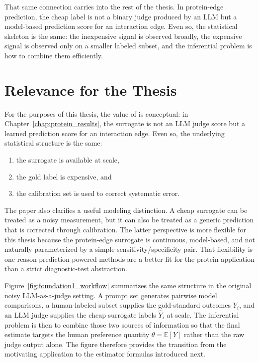 That same connection carries into the rest of the thesis. In protein-edge prediction, the cheap label is not a binary judge produced by an LLM but a model-based prediction score for an interaction edge. Even so, the statistical skeleton is the same: the inexpensive signal is observed broadly, the expensive signal is observed only on a smaller labeled subset, and the inferential problem is how to combine them efficiently.


\section{Relevance for the Thesis}

For the purposes of this thesis, the value of \textcite{llmjudge_eif} is conceptual: in Chapter~\ref{chap:protein_results}, the surrogate is not an LLM judge score but a learned prediction score for an interaction edge. Even so, the underlying statistical structure is the same:

\begin{enumerate}
    \item the surrogate is available at scale,
    \item the gold label is expensive, and
    \item the calibration set is used to correct systematic error.
\end{enumerate}

The paper also clarifies a useful modeling distinction. A cheap surrogate can be treated as a noisy measurement, but it can also be treated as a generic prediction that is corrected through calibration. The latter perspective is more flexible for this thesis because the protein-edge surrogate is continuous, model-based, and not naturally parameterized by a simple sensitivity/specificity pair. That flexibility is one reason prediction-powered methods are a better fit for the protein application than a strict diagnostic-test abstraction.

Figure~\ref{fig:foundation1_workflow} summarizes the same structure in the original noisy LLM-as-a-judge setting. A prompt set generates pairwise model comparisons, a human-labeled subset supplies the gold-standard outcomes \(Y_i\), and an LLM judge supplies the cheap surrogate labels \(\widehat{Y}_i\) at scale. The inferential problem is then to combine those two sources of information so that the final estimate targets the human preference quantity \(\theta = \mathbb{E}[Y]\) rather than the raw judge output alone. The figure therefore provides the transition from the motivating application to the estimator formulas introduced next.

